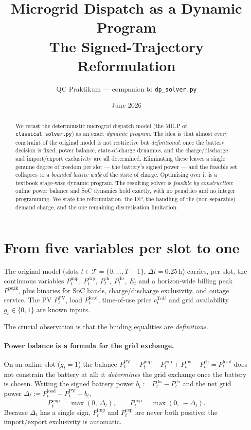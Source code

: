 \documentclass[11pt]{article}
\title{Microgrid Dispatch as a Dynamic Program\\[2pt]
\large The Signed-Trajectory Reformulation}
\author{QC Praktikum --- companion to \texttt{dp\_solver.py}}
\date{June 2026}
\newcommand{\Pimp}{P^{\text{imp}}}
\newcommand{\Pexp}{P^{\text{exp}}}
\newcommand{\Pch}{P^{\text{ch}}}
\newcommand{\Pdis}{P^{\text{dis}}}
\newcommand{\Ppk}{P^{\text{peak}}}
\newcommand{\Ppv}{P^{\text{PV}}}
\newcommand{\Pload}{P^{\text{load}}}
\newcommand{\ctou}{c^{\text{ToU}}}
\begin{document}
\maketitle

\begin{abstract}
We recast the deterministic microgrid dispatch model (the MILP of
\texttt{classical\_solver.py}) as an exact \emph{dynamic program}. The idea is
that almost every constraint of the original model is not restrictive but
\emph{definitional}: once the battery decision is fixed, power balance,
state-of-charge dynamics, and the charge/discharge and import/export exclusivity
are all determined. Eliminating these leaves a single genuine degree of freedom
per slot --- the battery's signed power --- and the feasible set collapses to a
\emph{bounded lattice walk} of the state of charge. Optimising over it is a
textbook stage-wise dynamic program. The resulting solver is \emph{feasible by
construction}: online power balance and SoC dynamics hold exactly, with no
penalties and no integer programming. We state the reformulation, the DP, the
handling of the (non-separable) demand charge, and the one remaining
discretisation limitation.
\end{abstract}

\section{From five variables per slot to one}

The original model (slots $t\in\mathcal{T}=\{0,\dots,T-1\}$, $\Delta t = 0.25$\,h)
carries, per slot, the continuous variables
$\Pimp_t,\ \Pexp_t,\ \Pch_t,\ \Pdis_t,\ E_t$ and a horizon-wide billing peak
$\Ppk$, plus binaries for SoC bands, charge/discharge exclusivity, and outage
service. The PV $\Ppv_t$, load $\Pload_t$, time-of-use price $\ctou_t$ and grid
availability $g_t\in\{0,1\}$ are known inputs.

The crucial observation is that the binding equalities are \emph{definitions}.

\paragraph{Power balance is a formula for the grid exchange.}
On an online slot ($g_t=1$) the balance
\(
\Ppv_t + \Pimp_t - \Pexp_t + \Pdis_t - \Pch_t = \Pload_t
\)
does not constrain the battery at all: it \emph{determines} the grid exchange
once the battery is chosen. Writing the signed battery power
$b_t := \Pdis_t - \Pch_t$ and the net grid power
$\Delta_t := \Pload_t - \Ppv_t - b_t$,
\begin{equation}
  \Pimp_t = \max(0,\ \Delta_t), \qquad
  \Pexp_t = \max(0,\ -\Delta_t).
  \label{eq:grid}
\end{equation}
Because $\Delta_t$ has a single sign, $\Pimp_t$ and $\Pexp_t$ are never both
positive: the import/export exclusivity is automatic.
\end{document}
